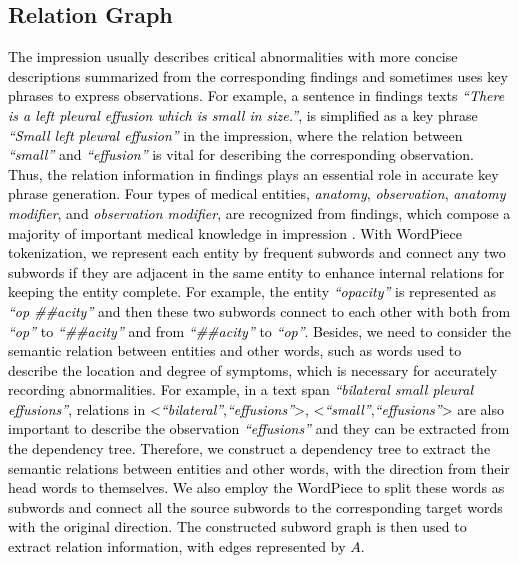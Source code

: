 \documentclass[11pt]{article}
\begin{document}
\subsection{Relation Graph}
\label{relation_graph}
\textcolor{black}{
%
The impression usually describes critical abnormalities with more concise descriptions summarized from the corresponding findings and sometimes uses key phrases to express observations.
%
For example, a sentence in findings texts \textit{``There is a left pleural effusion which is small in size.''}, is simplified as a key phrase \textit{``Small left pleural effusion''} in the impression, where the relation between \textit{``small''} and \textit{``effusion''} is vital for describing the corresponding observation.
%
Thus, the relation information in findings plays an essential role in accurate key phrase generation.
%
Four types of medical entities, \textit{anatomy}, \textit{observation}, \textit{anatomy modifier}, and \textit{observation modifier}, are recognized from findings, which compose a majority of important medical knowledge in impression \cite{hassanpour2016information}.
%
With WordPiece tokenization, we represent each entity by frequent subwords and connect any two subwords if they are adjacent in the same entity to enhance internal relations for keeping the entity complete.
%
For example, the entity \textit{``opacity''} is represented as \textit{``op \#\#acity''} and then these two subwords connect to each other with both from \textit{``op''} to \textit{``\#\#acity''} and from \textit{``\#\#acity''} to \textit{``op''}.
%
Besides, we need to consider the semantic relation between entities and other words, such as words used to describe the location and degree of symptoms, which is necessary for accurately recording abnormalities.
%
For example, in a text span \textit{``bilateral small pleural effusions''}, relations in <\textit{``bilateral''},\textit{``effusions''}>, <\textit{``small''},\textit{``effusions''}> are also important to describe the observation \textit{``effusions''} and they can be extracted from the dependency tree.
%
Therefore, we construct a dependency tree to extract the semantic relations between entities and other words, with the direction from their head words to themselves.
%
We also employ the WordPiece to split these words as subwords and connect all the source subwords to the corresponding target words with the original direction.
%
The constructed subword graph is then used to extract relation information, with edges represented by $A$.
}

\end{document}
